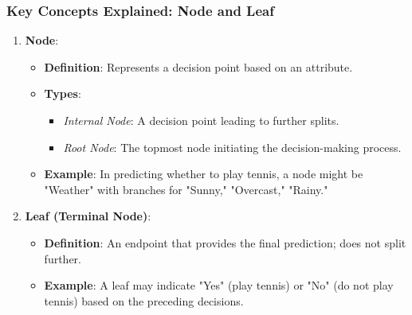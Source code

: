 \documentclass[aspectratio=169]{beamer}
\begin{document}
\begin{frame}
    \frametitle{Key Concepts Explained: Node and Leaf}
    \begin{enumerate}
        \item \textbf{Node}:
        \begin{itemize}
            \item \textbf{Definition}: Represents a decision point based on an attribute.
            \item \textbf{Types}:
            \begin{itemize}
                \item \textit{Internal Node}: A decision point leading to further splits.
                \item \textit{Root Node}: The topmost node initiating the decision-making process.
            \end{itemize}
            \item \textbf{Example}: In predicting whether to play tennis, a node might be "Weather" with branches for "Sunny," "Overcast," "Rainy."
        \end{itemize}
        
        \item \textbf{Leaf (Terminal Node)}:
        \begin{itemize}
            \item \textbf{Definition}: An endpoint that provides the final prediction; does not split further.
            \item \textbf{Example}: A leaf may indicate "Yes" (play tennis) or "No" (do not play tennis) based on the preceding decisions.
        \end{itemize}
    \end{enumerate}
\end{frame}
\end{document}
